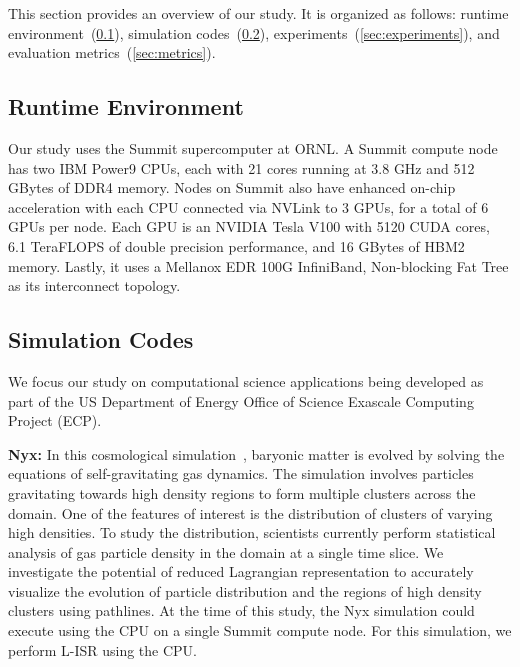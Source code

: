 This section provides an overview of our study. It is organized as follows: runtime environment~(\ref{sec:runtime}), simulation codes~(\ref{sec:simulations}), experiments~(\ref{sec:experiments}), and evaluation metrics~(\ref{sec:metrics}). %

\subsection{Runtime Environment}
\label{sec:runtime}
Our study uses the Summit supercomputer at ORNL.
%
A Summit compute node has two IBM Power9 CPUs, each with 21 cores running at 3.8 GHz and 512 GBytes of DDR4 memory.
%
Nodes on Summit also have enhanced on-chip acceleration with each CPU connected via NVLink to 3 GPUs, for a total of 6 GPUs per node.
%
Each GPU is an NVIDIA Tesla V100 with 5120 CUDA cores, 6.1 TeraFLOPS of double precision performance, and 16 GBytes of HBM2 memory.
%
Lastly, it uses a Mellanox EDR 100G InfiniBand, Non-blocking Fat Tree as its interconnect topology.

\subsection{Simulation Codes}
\label{sec:simulations}
We focus our study on 
computational science applications being developed as part of the US Department of Energy Office of Science Exascale Computing Project (ECP).
%
%

\textbf{Nyx:} In this cosmological simulation~\cite{almgren2013nyx}, baryonic matter is evolved by solving the equations of self-gravitating gas dynamics.
%
The simulation involves particles gravitating towards high density regions to form multiple clusters across the domain. 
%
%
One of the features of interest is the distribution of clusters of varying high densities.
%
To study the distribution, scientists currently perform statistical analysis of gas particle density in the domain at a single time slice.
%
We investigate the potential of reduced Lagrangian representation to accurately visualize the evolution of particle distribution and the regions of high density clusters using pathlines.
%
At the time of this study, the Nyx simulation could execute using the CPU on a single Summit compute node.
%
For this simulation, we perform L-ISR using the CPU.

